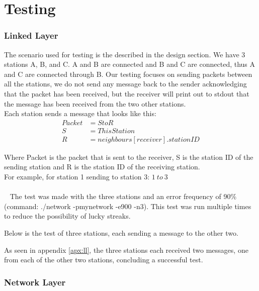 \section{Testing}


\subsubsection{Linked Layer}
The scenario used for testing is the described in the design section.
We have 3 stations A, B, and C. A and B are connected and B and C are connected, thus A and C are connected through B. Our testing focuses on sending packets between all the stations, we do not send any message back to the sender acknowledging that the packet has been received, but the receiver will print out to stdout that the message has been received from the two other stations.\\

Each station sends a message that looks like this:
\begin{align*}
Packet &= S to R\\
S &= ThisStation\\
R &= neighbours[receiver].stationID
\end{align*}

Where Packet is the packet that is sent to the receiver, S is the station ID of the sending station and R is the station ID of the receiving station.\\
For example, for station 1 sending to station 3: $1\ to\ 3$\\
\\~
The test was made with the three stations and an error frequency of 90\% (command: ./network -pmynetwork -e900 -n3). This test was run multiple times to reduce the possibility of lucky streaks.

Below is the test of three stations, each sending a message to the other two.

As seen in appendix \ref{apx:ll}, the three stations each received two messages, one from each of the other two stations, concluding a successful test.



\subsubsection{Network Layer}


